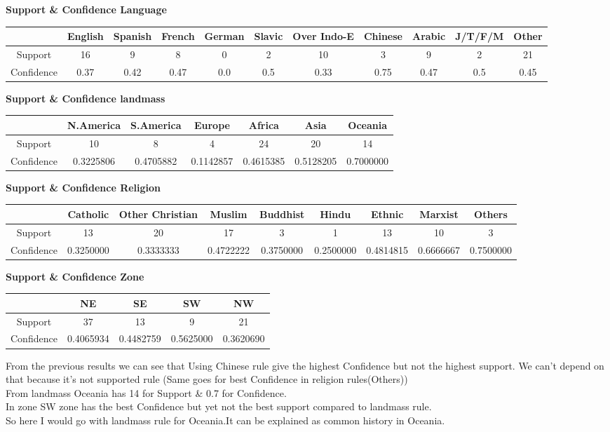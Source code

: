 \documentclass{article}
\begin{document}
	\textbf{Support \& Confidence Language} 
	\begin{flushleft}
		\begin{tabular}{|c|c|c|c|c|c|c|c|c|c|c|}
			\hline
			&English&Spanish&French&German&Slavic&Over Indo-E & Chinese&Arabic&J/T/F/M&Other\\
			\hline
			Support&16&9&8&0&2&10&3&9&2&21\\
			\hline
			Confidence&0.37&0.42&0.47&0.0&0.5&0.33&0.75&0.47&0.5&0.45\\
			\hline
		\end{tabular}
	\end{flushleft}
	\textbf{Support \& Confidence landmass} 
	\begin{flushleft}
		\begin{tabular}{|c|c|c|c|c|c|c|}
			\hline
			&N.America&S.America&Europe&Africa&Asia&Oceania \\
			\hline
			Support&10&8&4&24&20&14 \\
			\hline
			Confidence&0.3225806&0.4705882&0.1142857&0.4615385&0.5128205&0.7000000\\
			\hline
		\end{tabular}
	\end{flushleft}
	\textbf{Support \& Confidence Religion}
	\begin{flushleft}
		\begin{tabular}{|c|c|c|c|c|c|c|c|c|}
			\hline
			&Catholic&Other Christian&Muslim&Buddhist&Hindu&Ethnic&Marxist&Others\\
			\hline
			Support&13&20&17&3&1&13&10&3\\
			\hline
			Confidence&0.3250000&0.3333333&0.4722222&0.3750000&0.2500000&0.4814815&0.6666667&0.7500000\\
			\hline
		\end{tabular}
	\end{flushleft}
	\textbf{Support \& Confidence Zone}
	\begin{flushleft}
		\begin{tabular}{|c|c|c|c|c|}
			\hline
			&NE&SE&SW&NW\\
			\hline
			Support&37&13&9&21\\
			\hline
			Confidence&0.4065934&0.4482759&0.5625000&0.3620690\\
			\hline
		\end{tabular}
	\end{flushleft}
	From the previous results we can see that Using Chinese rule give the highest Confidence but not the highest support. We can't depend on that because it's not supported rule (Same goes for best Confidence in religion rules(Others))\\
	From landmass Oceania has 14 for Support \& 0.7 for Confidence.\\
	In zone SW zone has the best Confidence but yet not the best support compared to landmass rule.\\
	So here I would go with landmass rule for Oceania.It can be explained as common history in Oceania.
\end{document}
